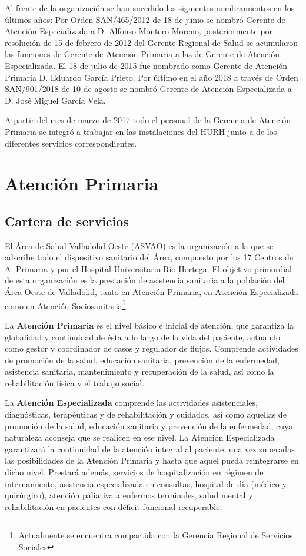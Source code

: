 Al frente de la organización se han sucedido los siguientes nombramientos en los últimos años: Por Orden SAN/465/2012 de 18 de junio \cite{noauthor_orden_2012} se nombró Gerente de Atención Especializada a D. Alfonso Montero Moreno, posteriormente por resolución de 15 de febrero de 2012 del Gerente Regional de Salud se acumularon las funciones de Gerente de Atención Primaria a las de Gerente de Atención Especializada.
El 18 de julio de 2015 fue nombrado como Gerente de Atención Primaria D. Eduardo García Prieto.
Por último en el año 2018 a través de Orden SAN/901/2018 de 10 de agosto \cite{noauthor_orden_2018} se nombró Gerente de Atención Especializada a D. José Miguel García Vela.

A partir del mes de marzo de 2017 todo el personal de la Gerencia de Atención Primaria se integró a trabajar en las instalaciones del HURH junto a de los diferentes servicios correspondientes.

\section{Atención Primaria}

\subsection{Cartera de servicios}

El Área de Salud Valladolid Oeste (ASVAO) es la organización a la que se adscribe todo el dispositivo sanitario del Área, compuesto por los 17 Centros de A. Primaria y por el Hospital Universitario Río Hortega.
El objetivo primordial de esta organización es la prestación de asistencia sanitaria a la población del Área Oeste de Valladolid, tanto en Atención Primaria, en Atención Especializada como en Atención Sociosanitaria\footnote{Actualmente se encuentra compartida con la Gerencia Regional de Servicios Sociales}.

La \textbf{Atención Primaria} es el nivel básico e inicial de atención, que garantiza la globalidad y continuidad de ésta a lo largo de la vida del paciente, actuando como gestor y coordinador de casos y regulador de flujos.
Comprende actividades de promoción de la salud, educación sanitaria, prevención de la enfermedad, asistencia sanitaria, mantenimiento y recuperación de la salud, así como la rehabilitación física y el trabajo social.

La \textbf{Atención Especializada} comprende las actividades asistenciales, diagnósticas, terapéuticas y de rehabilitación y cuidados, así como aquellas de promoción de la salud, educación sanitaria y prevención de la enfermedad, cuya naturaleza aconseja que se realicen en ese nivel.
La Atención Especializada garantizará la continuidad de la atención integral al paciente, una vez superadas las posibilidades de la Atención Primaria y hasta que aquel pueda reintegrarse en dicho nivel.
Prestará además, servicios de hospitalización en régimen de internamiento, asistencia especializada en consultas, hospital de día (médico y quirúrgico), atención paliativa a enfermos terminales, salud mental y rehabilitación en pacientes con déficit funcional recuperable.

